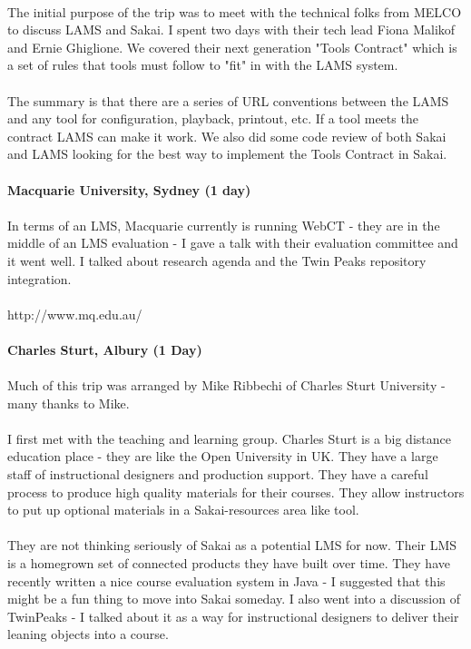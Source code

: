 \documentclass[12pt]{book}
\begin{document}
\\
The initial purpose of the trip was to meet with the technical folks from MELCO to discuss LAMS and Sakai.   I spent two days with their tech lead Fiona Malikof and Ernie Ghiglione. We covered their next generation "Tools Contract" which is a set of rules that tools must follow to "fit" in with the LAMS system.   \\
\\
The summary is that there are a series of URL conventions between the LAMS and any tool for configuration, playback, printout, etc.   If a tool meets the contract LAMS can make it work.   We also did some code review of both Sakai and LAMS looking for the best way to implement the Tools Contract in Sakai.\\
\\
{\bf Macquarie University, Sydney (1 day)}\\
\\
In terms of an LMS, Macquarie currently is running WebCT - they are in the middle of an LMS evaluation - I gave a talk with their evaluation committee and it went well.   I talked about research agenda and the Twin Peaks repository integration.\\
\\
http://www.mq.edu.au/\\
\\
{\bf Charles Sturt, Albury (1 Day)}\\
\\
Much of this trip was arranged by Mike Ribbechi of Charles Sturt University - many thanks to Mike.   \\
\\
I first met with the teaching and learning group.   Charles Sturt is a big distance education place - they are like the Open University in UK.   They have a large staff of instructional designers and production support.   They have a careful process to produce high quality materials for their courses.   They allow instructors to put up optional materials in a Sakai-resources area like tool.   \\
\\
They are not thinking seriously of Sakai as a potential LMS for now.   Their LMS is a homegrown set of connected products they have built over time.   They have recently written a nice course evaluation system in Java - I suggested that this might be a fun thing to move into Sakai someday.   I also went into a discussion of TwinPeaks   - I talked about it as a way for instructional designers to deliver their leaning objects into a course.\\
\end{document}
